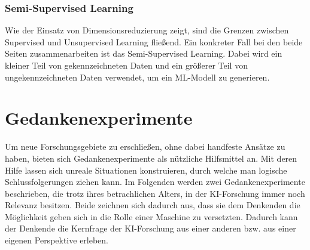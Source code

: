\documentclass[12pt,german,ngerman]{report}
\begin{document}
    \subsection{Semi-Supervised Learning}
        Wie der Einsatz von Dimensionsreduzierung zeigt, sind die Grenzen zwischen Supervised und Unsupervised Learning fließend.
        Ein konkreter Fall bei den beide Seiten zusammenarbeiten ist das Semi-Supervised Learning.
        Dabei wird ein kleiner Teil von gekennzeichneten Daten und ein größerer Teil von ungekennzeichneten Daten verwendet,
        um ein ML-Modell zu generieren.\cite{semisupervised2021mlmastery}


            

\chapter{Gedankenexperimente}
    Um neue Forschungsgebiete zu erschließen, ohne dabei handfeste Ansätze zu haben,
    bieten sich Gedankenexperimente als nützliche Hilfsmittel an.
    Mit deren Hilfe lassen sich unreale Situationen konstruieren, durch welche man logische Schlussfolgerungen ziehen kann.
    Im Folgenden werden zwei Gedankenexperimente beschrieben, die trotz ihres betrachlichen Alters, in der KI-Forschung
    immer noch Relevanz besitzen. Beide zeichnen sich dadurch aus, dass sie dem Denkenden die Möglichkeit geben sich in die
    Rolle einer Maschine zu versetzten. Dadurch kann der Denkende die Kernfrage der KI-Forschung aus einer anderen
    bzw. aus einer eigenen Perspektive erleben. 
\end{document}
